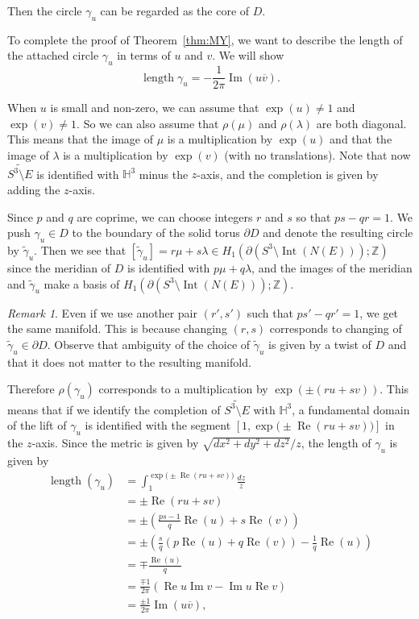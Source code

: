 \documentclass{amsart}
\newcommand{\Z}{\mathbb{Z}}
\renewcommand{\H}{\mathbb{H}}
\newcommand{\Int}{\operatorname{Int}}
\newcommand{\length}{\operatorname{length}}
\renewcommand{\Re}{\operatorname{Re}}
\renewcommand{\Im}{\operatorname{Im}}
\theoremstyle{definition}
\theoremstyle{remark}
\newtheorem{remark}[theorem]{Remark}
\numberwithin{equation}{section}
\begin{document}
Then the circle $\gamma_u$ can be regarded as the core of $D$.
\par
To complete the proof of Theorem~\ref{thm:MY}, we want to describe the length of the attached circle $\gamma_u$ in terms of $u$ and $v$.
We will show
\begin{equation}\label{eq:length}
  \length{\gamma}_{u}
  =
  -\frac{1}{2\pi}\Im\left(u\overline{v}\right).
\end{equation}
\par
When $u$ is small and non-zero, we can assume that $\exp(u)\ne1$ and $\exp(v)\ne1$.
So we can also assume that $\rho(\mu)$ and $\rho(\lambda)$ are both diagonal.
This means that the image of $\mu$ is a multiplication by $\exp(u)$ and that the image of $\lambda$ is a multiplication by $\exp(v)$ (with no translations).
Note that now $\widetilde{S^3\setminus{E}}$ is identified with $\H^3$ minus the $z$-axis, and the completion is given by adding the $z$-axis.
\par
Since $p$ and $q$ are coprime, we can choose integers $r$ and $s$ so that $ps-qr=1$.
We push $\gamma_u\in D$ to the boundary of the solid torus $\partial D$ and denote the resulting circle by $\tilde{\gamma}_u$.
Then we see that $[\tilde{\gamma}_u]=r\mu+s\lambda\in H_1(\partial(S^3\setminus\Int(N(E)));\Z)$ since the meridian of $D$ is identified with $p\mu+q\lambda$, and the images of the meridian and $\tilde{\gamma}_u$ make a basis of $H_1(\partial(S^3\setminus\Int(N(E)));\Z)$.
\begin{remark}
Even if we use another pair $(r',s')$ such that $ps'-qr'=1$, we get the same manifold.
This is because changing $(r,s)$ corresponds to changing of $\tilde{\gamma}_u\in\partial D$.
Observe that ambiguity of the choice of $\tilde{\gamma}_u$ is given by a twist of $D$ and that it does not matter to the resulting manifold.
\end{remark}
\par
Therefore $\rho(\gamma_u)$ corresponds to a multiplication by $\exp(\pm(ru+sv))$.
This means that if we identify the completion of $\widetilde{S^3\setminus{E}}$ with $\H^3$, a fundamental domain of the lift of $\gamma_u$ is identified with the segment $[1,\exp\bigl(\pm\Re(ru+sv)\bigr)]$ in the $z$-axis.
Since the metric is given by $\sqrt{dx^2+dy^2+dz^2}/z$, the length of $\gamma_u$ is given by
\begin{equation*}
\begin{split}
  \length(\gamma_u)
  &=
  \int_{1}^{\exp\bigl(\pm\Re(ru+sv)\bigr)}\frac{dz}{z}
  \\
  &=
  \pm\Re(ru+sv)
  \\
  &=
  \pm\left(\frac{ps-1}{q}\Re(u)+s\Re(v)\right)
  \\
  &=
  \pm\left(\frac{s}{q}(p\Re(u)+q\Re(v))-\frac{1}{q}\Re(u)\right)
  \\
  &=
  \mp\frac{\Re(u)}{q}
  \\
  &=
  \frac{\mp1}{2\pi}\left(\Re{u}\Im{v}-\Im{u}\Re{v}\right)
  \\
  &=
  \frac{\pm1}{2\pi}\Im(u\overline{v}),
\end{split}
\end{equation*}
\end{document}
